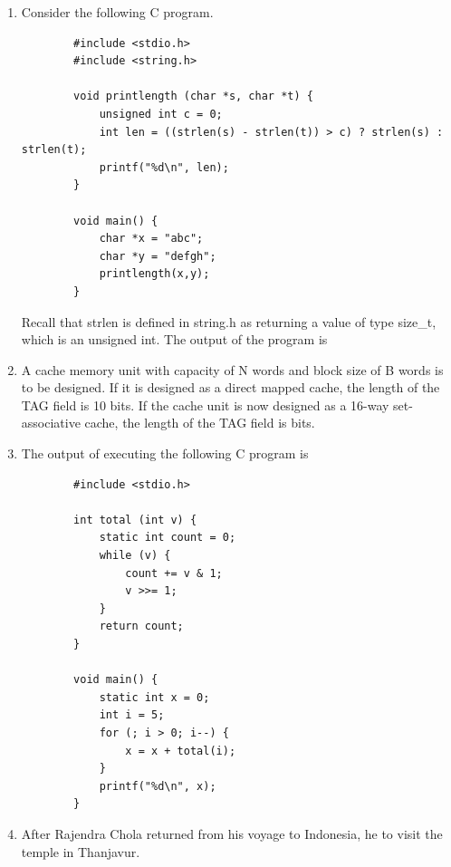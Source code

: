 \documentclass[a4paper, 11pt]{article}
\begin{document}
\begin{enumerate}
    \hfill{}

    \item Consider the following C program.
    \begin{verbatim}
        #include <stdio.h>
        #include <string.h>
        
        void printlength (char *s, char *t) {
            unsigned int c = 0;
            int len = ((strlen(s) - strlen(t)) > c) ? strlen(s) : strlen(t);
            printf("%d\n", len);
        }
        
        void main() {
            char *x = "abc";
            char *y = "defgh";
            printlength(x,y);
        }
    \end{verbatim}
    Recall that strlen is defined in string.h as returning a value of type size\_t, which is an unsigned int. The output of the program is \underline{\hspace{2cm}}

    \hfill{}

    \item A cache memory unit with capacity of N words and block size of B words is to be designed. If it is designed as a direct mapped cache, the length of the TAG field is 10 bits. If the cache unit is now designed as a 16-way set-associative cache, the length of the TAG field is \underline{\hspace{2cm}} bits.
    
    \hfill{}

    \item The output of executing the following C program is \underline{\hspace{2cm}}
    \begin{verbatim}
        #include <stdio.h>
        
        int total (int v) {
            static int count = 0;
            while (v) {
                count += v & 1;
                v >>= 1;
            }
            return count;
        }
        
        void main() {
            static int x = 0;
            int i = 5;
            for (; i > 0; i--) {
                x = x + total(i);
            }
            printf("%d\n", x);
        }
    \end{verbatim}
    
    \hfill{}
    
    \item After Rajendra Chola returned from his voyage to Indonesia, he \underline{\hspace{2cm}} to visit the temple in Thanjavur.
    \begin{enumerate}
    \end{enumerate}


\end{enumerate}
\end{document}
